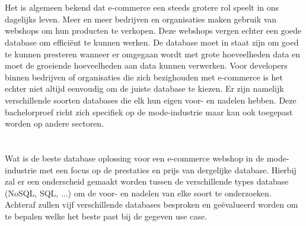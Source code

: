 \section{}%
\label{sec:probleemstelling}

Het is algemeen bekend dat e-commerce een steeds grotere rol speelt in ons dagelijks leven.
Meer en meer bedrijven en organisaties maken gebruik van webshops om hun producten te verkopen.
Deze webshops vergen echter een goede database om efficiënt te kunnen werken.
De database moet in staat zijn om goed te kunnen presteren wanneer er omgegaan wordt met grote hoeveelheden data en moet de groeiende hoeveelheden aan data kunnen verwerken.
Voor developers binnen bedrijven of organisaties die zich bezighouden met e-commerce is het echter niet altijd eenvoudig om de juiste database te kiezen.
Er zijn namelijk verschillende soorten databases die elk hun eigen voor- en nadelen hebben.
Deze bachelorproef richt zich specifiek op de mode-industrie maar kan ook toegepast worden op andere sectoren.




\section{}%
\label{sec:onderzoeksvraag}

Wat is de beste database oplossing voor een e-commerce webshop in de mode-industrie met een focus op de prestaties en prijs van dergelijke database. Hierbij zal er een onderscheid gemaakt worden tussen de verschillende types database (NoSQL, SQL, ...) om de voor- en nadelen van elke soort te onderzoeken. Achteraf zullen vijf verschillende databases besproken en geëvalueerd worden om te bepalen welke het beste past bij de gegeven use case.


